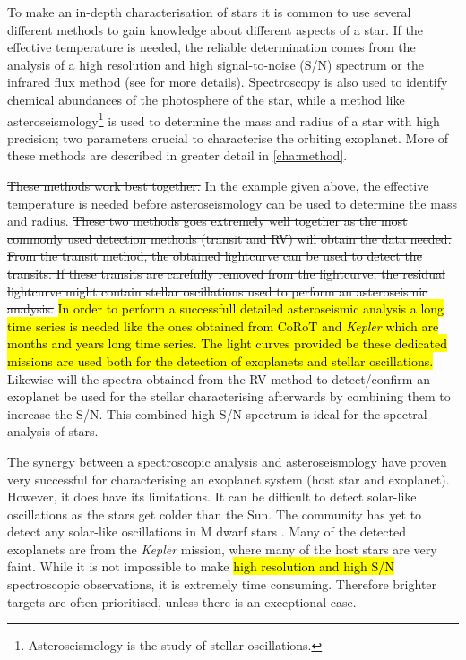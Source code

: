 To make an in-depth characterisation of stars it is common to use several different methods to gain
knowledge about different aspects of a star. If the effective temperature is needed, the reliable
determination comes from the analysis of a high resolution and high signal-to-noise (S/N) spectrum
or the infrared flux method (see  for more details). Spectroscopy is also used to
identify chemical abundances of the photosphere of the star, while a method like
asteroseismology\footnote{Asteroseismology is the study of stellar oscillations.} is used to
determine the mass and radius of a star with high precision; two parameters crucial to characterise
the orbiting exoplanet. More of these methods are described in greater detail in \cref{cha:method}.

\st{These methods work best together.} In the example given above, the effective temperature is
needed before asteroseismology can be used to determine the mass and radius. \st{These two methods
goes extremely well together as the most commonly used detection methods (transit and RV) will
obtain the data needed. From the transit method, the obtained lightcurve can be used to detect the
transits. If these transits are carefully removed from the lightcurve, the residual lightcurve might
contain stellar oscillations used to perform an asteroseismic analysis.} \hl{In order to perform a
successfull detailed asteroseismic analysis a long time series is needed like the ones obtained from
CoRoT and \emph{Kepler} which are months and years long time series. The light curves provided be
these dedicated missions are used both for the detection of exoplanets and stellar oscillations.}
Likewise will the spectra obtained from the RV method to detect/confirm an exoplanet be used for the
stellar characterising afterwards by combining them to increase the S/N. This combined high S/N
spectrum is ideal for the spectral analysis of stars.

The synergy between a spectroscopic analysis and asteroseismology have proven very successful
\citep[see e.g.][]{Huber2013} for characterising an exoplanet system (host star and exoplanet).
However, it does have its limitations. It can be difficult to detect solar-like oscillations as the
stars get colder than the Sun. The community has yet to detect any solar-like oscillations in M
dwarf stars \citep{Rodriguez2016,Berdinas2017}. Many of the detected exoplanets are from the
\emph{Kepler} mission, where many of the host stars are very faint. While it is not impossible to
make \hl{high resolution and high S/N} spectroscopic observations, it is extremely time consuming.
Therefore brighter targets are often prioritised, unless there is an exceptional case.

